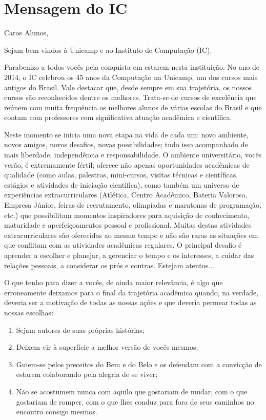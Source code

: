 
\section{Mensagem do IC}

Caros Alunos,

Sejam bem-vindos à Unicamp e ao Instituto de Computação (IC). 

Parabenizo a todos vocês pela conquista em estarem nesta instituição. No ano de
2014, o IC celebrou os 45 anos da Computação na Unicamp, um dos cursos mais
antigos do Brasil. Vale destacar que, desde sempre em sua trajetória, os nossos
cursos são reconhecidos dentre os melhores.  Trata-se de cursos de excelência
que reúnem com muita frequência os melhores alunos de várias escolas do Brasil e
que contam com professores com significativa atuação acadêmica e científica.

Neste momento se inicia uma nova etapa na vida de cada um: novo ambiente, novos
amigos, novos desafios, novas possibilidades; tudo isso acompanhado de mais
liberdade, independência e responsabilidade.  O ambiente universitário, vocês
verão, é extremamente fértil; oferece não apenas oportunidades acadêmicas de
qualidade (como aulas, palestras, mini-cursos, visitas técnicas e científicas,
estágios e atividades de iniciação científica), como também um universo de
experiências extracurriculares (Atlética, Centro Acadêmico, Bateria Valorosa,
Empresa Júnior, feiras de recrutamento, olimpíadas e maratonas de programação,
etc.) que possibilitam momentos inspiradores para aquisição de conhecimento,
maturidade e aperfeiçoamentos pessoal e profissional. Muitas destas atividades
extracurriculares são oferecidas ao mesmo tempo e não são raras as situações em
que conflitam com as atividades acadêmicas regulares. O principal desafio é
aprender a escolher e planejar, a gerenciar o tempo e os interesses, a cuidar
das relações pessoais, a considerar os prós e contras. Estejam atentos...

O que tenho para dizer a vocês, de ainda maior relevância, é algo que
erroneamente deixamos para o final da trajetória acadêmica quando, na verdade,
deveria ser a motivação de todas as nossas ações e que deveria permear todas as
nossas escolhas:

\begin{enumerate}
\item Sejam autores de suas próprias histórias;

\item Deixem vir à superfície a melhor versão de vocês mesmos;

\item Guiem-se pelos preceitos do Bem e do Belo e os defendam com a convicção de
  estarem colaborando pela alegria de se viver;

\item Não se acostumem nunca com aquilo que gostariam de mudar, com o que
  gostariam de romper, com o que lhes conduz para fora de seus caminhos no
  encontro consigo mesmos.
\end{enumerate}

